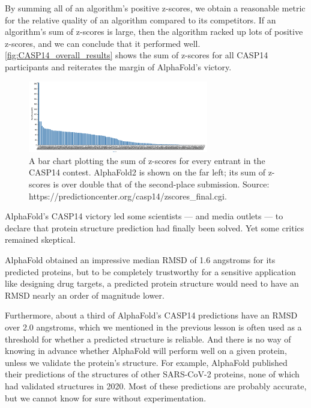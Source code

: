 {{By summing all of an algorithm's positive z-scores, we obtain a reasonable metric for the relative quality of an algorithm compared to its competitors. If an algorithm's sum of z-scores is large, then the algorithm racked up lots of positive z-scores, and we can conclude that it performed well. \autoref{fig:CASP14_overall_results} shows the sum of z-scores for all CASP14 participants and reiterates the margin of AlphaFold's victory.

\begin{figure}[h]
	\centering
	\mySfFamily
	\includegraphics[width = 0.7\textwidth]{../images/CASP14_overall_results.png}
	\caption{A bar chart plotting the sum of z-scores for every entrant in the CASP14 contest. AlphaFold2 is shown on the far left; its sum of z-scores is over double that of the second-place submission. Source: https://predictioncenter.org/casp14/zscores_final.cgi.}
	\label{fig:CASP14_overall_results}
\end{figure}

AlphaFold's CASP14 victory led some scientists --- and media outlets --- to declare that protein structure prediction had finally been solved. Yet some critics remained skeptical.

AlphaFold obtained an impressive median RMSD of 1.6 angstroms for its predicted proteins, but to be completely trustworthy for a sensitive application like designing drug targets, a predicted protein structure would need to have an RMSD nearly an order of magnitude lower.

Furthermore, about a third of AlphaFold's CASP14 predictions have an RMSD over 2.0 angstroms, which we mentioned in the previous lesson is often used as a threshold for whether a predicted structure is reliable. And there is no way of knowing in advance whether AlphaFold will perform well on a given protein, unless we validate the protein's structure. For example, AlphaFold published their predictions of the structures of other SARS-CoV-2 proteins, none of which had validated structures in 2020. Most of these predictions are probably accurate, but we cannot know for sure without experimentation.

}}
